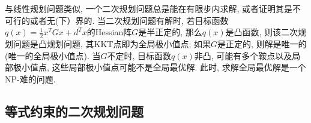 \documentclass{SBCbookchapter}
\begin{document}
与线性规划问题类似, 一个二次规划问题总是能在有限步内求解, 或者证明其是不可行的或者无(下）界的. 当二次规划问题有解时, 若目标函数$q(x) = \frac{1}{2} x^T G x + d^T x$的Hessian阵$G$是半正定的, 那么$q(x)$是凸函数, 则该二次规划问题是凸规划问题, 其KKT点即为全局极小值点; 如果$G$是正定的, 则解是唯一的(唯一的全局极小值点). 当$G$不定时, 目标函数$q(x)$非凸, 可能有多个鞍点以及局部极小值点, 这些局部极小值点可能不是全局最优解. 此时, 求解全局最优解是一个NP-难的问题.


\subsection{等式约束的二次规划问题}
\label{subsec:7.2.1}



\end{document}
